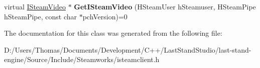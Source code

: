 \begin{DoxyCompactItemize}
\item 
\hypertarget{classISteamClient_a977b955b16685e80756acbe20ecfe277}{}virtual \hyperlink{classISteamVideo}{I\+Steam\+Video} $\ast$ {\bfseries Get\+I\+Steam\+Video} (H\+Steam\+User h\+Steamuser, H\+Steam\+Pipe h\+Steam\+Pipe, const char $\ast$pch\+Version)=0\label{classISteamClient_a977b955b16685e80756acbe20ecfe277}

\end{DoxyCompactItemize}


The documentation for this class was generated from the following file\+:\begin{DoxyCompactItemize}
\item 
D\+:/\+Users/\+Thomas/\+Documents/\+Development/\+C++/\+Last\+Stand\+Studio/last-\/stand-\/engine/\+Source/\+Include/\+Steamworks/isteamclient.\+h\end{DoxyCompactItemize}
